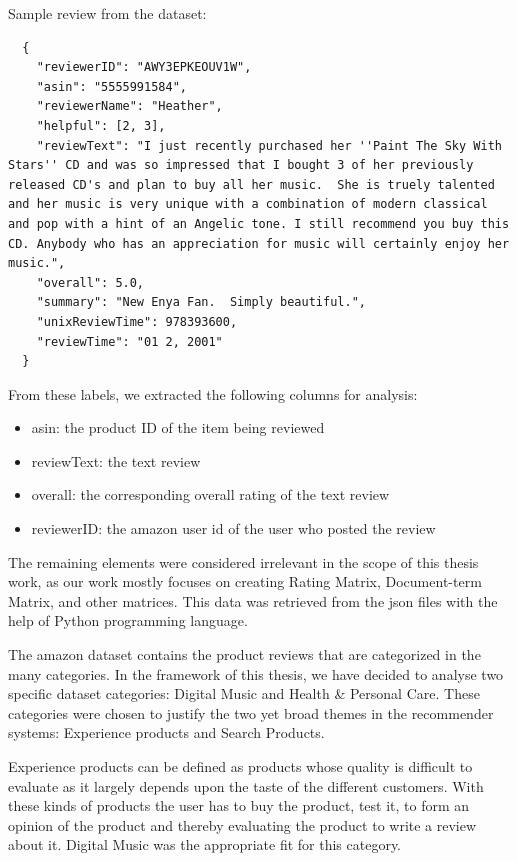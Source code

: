 Sample review from the dataset:
\begin{verbatim}
  {
    "reviewerID": "AWY3EPKEOUV1W", 
    "asin": "5555991584", 
    "reviewerName": "Heather", 
    "helpful": [2, 3], 
    "reviewText": "I just recently purchased her ''Paint The Sky With Stars'' CD and was so impressed that I bought 3 of her previously released CD's and plan to buy all her music.  She is truely talented and her music is very unique with a combination of modern classical and pop with a hint of an Angelic tone. I still recommend you buy this CD. Anybody who has an appreciation for music will certainly enjoy her music.",
    "overall": 5.0, 
    "summary": "New Enya Fan.  Simply beautiful.", 
    "unixReviewTime": 978393600, 
    "reviewTime": "01 2, 2001"
  }
\end{verbatim}

From these labels, we extracted the following columns for analysis:
\begin{itemize}
	\item asin: the product ID of the item being reviewed
	\item reviewText: the text review
	\item overall: the corresponding overall rating of the text review
	\item reviewerID: the amazon user id of the user who posted the review
\end{itemize}

The remaining elements were considered irrelevant in the scope of this thesis work, as our work mostly focuses on creating Rating Matrix, Document-term Matrix, and other matrices. This data was retrieved from the json files with the help of Python programming language.

The amazon dataset contains the product reviews that are categorized in the many categories. In the framework of this thesis, we have decided to analyse two specific dataset categories: Digital Music and Health \& Personal Care. These categories were chosen to justify the two yet broad themes in the recommender systems: Experience products and Search Products. 

Experience products can be defined as products whose quality is difficult to evaluate as it largely depends upon the taste of the different customers. With these kinds of products the user has to buy the product, test it, to form an opinion of the product and thereby evaluating the product to write a review about it. Digital Music was the appropriate fit for this category.

